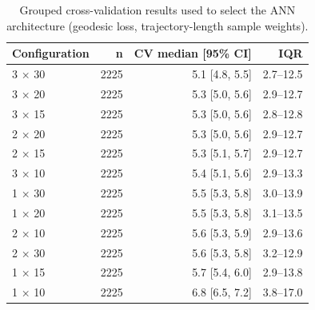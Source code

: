 \begin{table}[h!]
    \centering
    \caption{Grouped cross-validation results used to select the ANN architecture (geodesic loss, trajectory-length sample weights).}
    \label{tab:selection}
    \begin{tabular}{@{}lrrr@{}}
        \toprule
        Configuration & n & CV median [95\% CI] & IQR \\
        \midrule
        3 × 30 & 2225 & 5.1 [4.8, 5.5] & 2.7–12.5 \\
        3 × 20 & 2225 & 5.3 [5.0, 5.6] & 2.9–12.7 \\
        3 × 15 & 2225 & 5.3 [5.0, 5.6] & 2.8–12.8 \\
        2 × 20 & 2225 & 5.3 [5.0, 5.6] & 2.9–12.7 \\
        2 × 15 & 2225 & 5.3 [5.1, 5.7] & 2.9–12.7 \\
        3 × 10 & 2225 & 5.4 [5.1, 5.6] & 2.9–13.3 \\
        1 × 30 & 2225 & 5.5 [5.3, 5.8] & 3.0–13.9 \\
        1 × 20 & 2225 & 5.5 [5.3, 5.8] & 3.1–13.5 \\
        2 × 10 & 2225 & 5.6 [5.3, 5.9] & 2.9–13.6 \\
        2 × 30 & 2225 & 5.6 [5.3, 5.8] & 3.2–12.9 \\
        1 × 15 & 2225 & 5.7 [5.4, 6.0] & 2.9–13.8 \\
        1 × 10 & 2225 & 6.8 [6.5, 7.2] & 3.8–17.0 \\
        \bottomrule
    \end{tabular}
\end{table}
